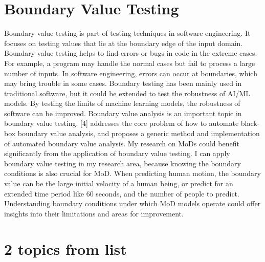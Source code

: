 \documentclass[11pt]{article}
\begin{document}
\section{Boundary Value Testing}
Boundary value testing is part of testing techniques in software engineering. It focuses on testing values that lie at the boundary edge of the input domain. Boundary value testing helps to find errors or bugs in code in the extreme cases. For example, a program may handle the normal cases but fail to process a large number of inputs. In software engineering, errors can occur at boundaries, which may bring trouble in some cases. Boundary testing has been mainly used in traditional software, but it could be extended to test the robustness of AI/ML models. By testing the limits of machine learning models, the robustness of software can be improved. Boundary value analysis is an important topic in boundary value testing. [4] addresses the core problem of how to automate black-box boundary value analysis, and proposes a generic method and implementation of automated boundary value analysis. My research on MoDs could benefit significantly from the application of boundary value testing. I can apply boundary value testing in my research area, because knowing the boundary conditions is also crucial for MoD. When predicting human motion, the boundary value can be the large initial velocity of a human being, or predict for an extended time period like 60 seconds, and the number of people to predict. Understanding boundary conditions under which MoD models operate could offer insights into their limitations and areas for improvement.


\section{2 topics from list}
\end{document}
